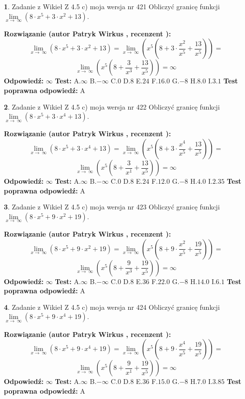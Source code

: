 \documentclass[12pt, a4paper]{article}
\theoremstyle{definition} %
\newtheorem{zad}{}
\newcommand{\zadStart}[1]{\begin{zad}#1\newline}
\newcommand{\zadStop}{\end{zad}}
\newcommand{\rozwStart}[2]{\noindent \textbf{Rozwiązanie (autor #1 , recenzent #2): }\newline}
\newcommand{\rozwStop}{\newline}
\newcommand{\odpStart}{\noindent \textbf{Odpowiedź:}\newline}
\newcommand{\odpStop}{\newline}
\newcommand{\testStart}{\noindent \textbf{Test:}\newline}
\newcommand{\testStop}{\newline}
\newcommand{\kluczStart}{\noindent \textbf{Test poprawna odpowiedź:}\newline}
\newcommand{\kluczStop}{\newline}
\begin{document}
\zadStart{Zadanie z Wikieł Z 4.5 c) moja wersja nr 421}
Obliczyć granicę funkcji  $\lim\limits_{x\to\ \infty}(8 \cdot x^{5}+3 \cdot x^{2}+13)$.
\zadStop
\rozwStart{Patryk Wirkus}{}
$$\lim\limits_{x\to\ \infty}(8 \cdot x^{5}+3 \cdot x^{2}+13) = \lim\limits_{x\to\ \infty}(x^{5}(8 +3 \cdot \frac{x^{2}}{x^{5}}+\frac{13}{x^{5}})) =$$ $$\lim\limits_{x\to\ \infty}(x^{5}(8 +\frac{3}{x^{3}}+\frac{13}{x^{5}})) =\infty$$
\rozwStop
\odpStart
$\infty$
\odpStop
\testStart
A.$\infty$ B.$-\infty$ C.$0$ D.$8$ E.$24$
F.$16.0$ G.$-8$
H.$8.0$
I.$3.1$
\testStop
\kluczStart
A
\kluczStop



\zadStart{Zadanie z Wikieł Z 4.5 c) moja wersja nr 422}
Obliczyć granicę funkcji  $\lim\limits_{x\to\ \infty}(8 \cdot x^{5}+3 \cdot x^{4}+13)$.
\zadStop
\rozwStart{Patryk Wirkus}{}
$$\lim\limits_{x\to\ \infty}(8 \cdot x^{5}+3 \cdot x^{4}+13) = \lim\limits_{x\to\ \infty}(x^{5}(8 +3 \cdot \frac{x^{4}}{x^{5}}+\frac{13}{x^{5}})) =$$ $$\lim\limits_{x\to\ \infty}(x^{5}(8 +\frac{3}{x^{1}}+\frac{13}{x^{5}})) =\infty$$
\rozwStop
\odpStart
$\infty$
\odpStop
\testStart
A.$\infty$ B.$-\infty$ C.$0$ D.$8$ E.$24$
F.$12.0$ G.$-8$
H.$4.0$
I.$2.35$
\testStop
\kluczStart
A
\kluczStop



\zadStart{Zadanie z Wikieł Z 4.5 c) moja wersja nr 423}
Obliczyć granicę funkcji  $\lim\limits_{x\to\ \infty}(8 \cdot x^{5}+9 \cdot x^{2}+19)$.
\zadStop
\rozwStart{Patryk Wirkus}{}
$$\lim\limits_{x\to\ \infty}(8 \cdot x^{5}+9 \cdot x^{2}+19) = \lim\limits_{x\to\ \infty}(x^{5}(8 +9 \cdot \frac{x^{2}}{x^{5}}+\frac{19}{x^{5}})) =$$ $$\lim\limits_{x\to\ \infty}(x^{5}(8 +\frac{9}{x^{3}}+\frac{19}{x^{5}})) =\infty$$
\rozwStop
\odpStart
$\infty$
\odpStop
\testStart
A.$\infty$ B.$-\infty$ C.$0$ D.$8$ E.$36$
F.$22.0$ G.$-8$
H.$14.0$
I.$6.1$
\testStop
\kluczStart
A
\kluczStop



\zadStart{Zadanie z Wikieł Z 4.5 c) moja wersja nr 424}
Obliczyć granicę funkcji  $\lim\limits_{x\to\ \infty}(8 \cdot x^{5}+9 \cdot x^{4}+19)$.
\zadStop
\rozwStart{Patryk Wirkus}{}
$$\lim\limits_{x\to\ \infty}(8 \cdot x^{5}+9 \cdot x^{4}+19) = \lim\limits_{x\to\ \infty}(x^{5}(8 +9 \cdot \frac{x^{4}}{x^{5}}+\frac{19}{x^{5}})) =$$ $$\lim\limits_{x\to\ \infty}(x^{5}(8 +\frac{9}{x^{1}}+\frac{19}{x^{5}})) =\infty$$
\rozwStop
\odpStart
$\infty$
\odpStop
\testStart
A.$\infty$ B.$-\infty$ C.$0$ D.$8$ E.$36$
F.$15.0$ G.$-8$
H.$7.0$
I.$3.85$
\testStop
\kluczStart
A
\kluczStop
\end{document}
